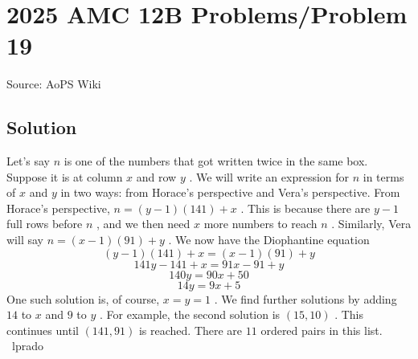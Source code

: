 \documentclass[12pt]{article}
\begin{document}
\section*{{2025 AMC 12B Problems/Problem 19}}
Source: AoPS Wiki

\subsection*{Solution}
Let's say $n$ is one of the numbers that got written twice in the same box. Suppose it is at column $x$ and row $y$ . We will write an expression for $n$ in terms of $x$ and $y$ in two ways: from Horace's perspective and Vera's perspective. From Horace's perspective, $n = (y-1)(141) + x$ . This is because there are $y-1$ full rows before $n$ , and we then need $x$ more numbers to reach $n$ . Similarly, Vera will say $n = (x-1)(91) + y$ . We now have the Diophantine equation \[(y-1)(141) + x = (x-1)(91)+y\] \[141y-141+x = 91x-91+y\] \[140y=90x+50\] \[14y = 9x + 5\] One such solution is, of course, $x=y=1$ . We find further solutions by adding $14$ to $x$ and $9$ to $y$ . For example, the second solution is $(15,10)$ . This continues until $(141,91)$ is reached. There are $\boxed{11}$ ordered pairs in this list. ~lprado
\end{document}
